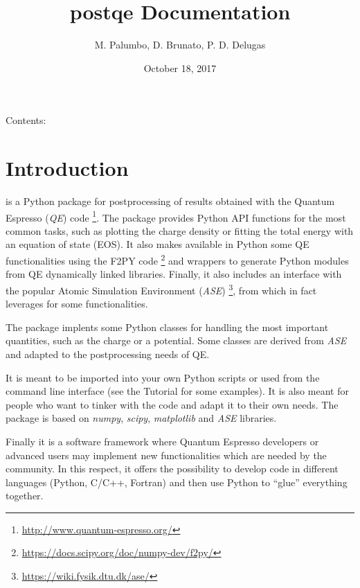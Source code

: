 \documentclass[letterpaper,10pt,english]{sphinxmanual}
\title{postqe Documentation}
\date{October 18, 2017}
\author{M. Palumbo, D. Brunato, P. D. Delugas}
\begin{document}
\maketitle
\tableofcontents
{}\label{index::doc}


Contents:


\chapter{Introduction}
\label{introduction:introduction}\label{introduction:id1}\label{introduction:welcome-to-postqe-s-documentation}\label{introduction::doc}
 is a Python package for postprocessing of results obtained with the Quantum Espresso (\emph{QE}) code \footnote[1]{
\href{http://www.quantum-espresso.org/}{http://www.quantum-espresso.org/}
}. The package provides Python API functions for the most common tasks, such as plotting the charge density or fitting the total energy with an equation of state (EOS). It also makes available in Python some QE functionalities using the F2PY code \footnote[2]{
\href{https://docs.scipy.org/doc/numpy-dev/f2py/}{https://docs.scipy.org/doc/numpy-dev/f2py/}
} and wrappers to generate Python modules from QE dynamically linked libraries. Finally, it also includes an interface with the popular Atomic Simulation Environment (\emph{ASE}) \footnote[3]{
\href{https://wiki.fysik.dtu.dk/ase/}{https://wiki.fysik.dtu.dk/ase/}
}, from which in fact leverages for some functionalities.

The package implents some Python classes for handling the most important quantities, such as the charge or a potential. Some classes are derived from \emph{ASE} and adapted to the postprocessing needs of QE.

It is meant to be imported into your own Python scripts or used from the command line interface (see the Tutorial for some examples). It is also meant for people who want to tinker with the code and adapt it to their own needs. The package is based on \emph{numpy}, \emph{scipy}, \emph{matplotlib} and \emph{ASE} libraries.

Finally it is a software framework where Quantum Espresso developers or advanced users may implement new functionalities which are needed by the community. In this respect, it offers the possibility to develop code in different languages (Python, C/C++, Fortran) and then use Python to ``glue'' everything together.
\end{document}
